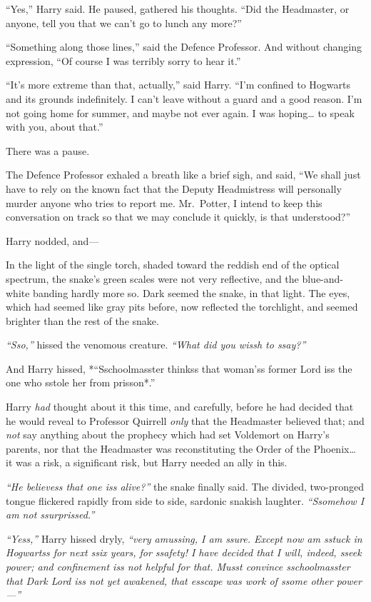 ``Yes,'' Harry said. He paused, gathered his thoughts. ``Did the
Headmaster, or anyone, tell you that we can't go to lunch any more?''

``Something along those lines,'' said the Defence Professor. And without
changing expression, ``Of course I was terribly sorry to hear it.''

``It's more extreme than that, actually,'' said Harry. ``I'm confined to
Hogwarts and its grounds indefinitely. I can't leave without a guard and
a good reason. I'm not going home for summer, and maybe not ever again.
I was hoping\ldots{} to speak with you, about that.''

There was a pause.

The Defence Professor exhaled a breath like a brief sigh, and said, ``We
shall just have to rely on the known fact that the Deputy Headmistress
will personally murder anyone who tries to report me. Mr.~Potter, I
intend to keep this conversation on track so that we may conclude it
quickly, is that understood?''

Harry nodded, and---

In the light of the single torch, shaded toward the reddish end of the
optical spectrum, the snake's green scales were not very reflective, and
the blue-and-white banding hardly more so. Dark seemed the snake, in
that light. The eyes, which had seemed like gray pits before, now
reflected the torchlight, and seemed brighter than the rest of the
snake.

\emph{``Sso,''} hissed the venomous creature. \emph{``What did you wissh
to ssay?''}

And Harry hissed, *``Sschoolmasster thinkss that woman'ss former Lord
iss the one who sstole her from prisson*.''

Harry \emph{had} thought about it this time, and carefully, before he
had decided that he would reveal to Professor Quirrell \emph{only} that
the Headmaster believed that; and \emph{not} say anything about the
prophecy which had set Voldemort on Harry's parents, nor that the
Headmaster was reconstituting the Order of the Phoenix\ldots{} it was a
risk, a significant risk, but Harry needed an ally in this.

\emph{``He believess that one iss alive?''} the snake finally said. The
divided, two-pronged tongue flickered rapidly from side to side,
sardonic snakish laughter. \emph{``Ssomehow I am not ssurprissed.''}

\emph{``Yess,''} Harry hissed dryly, \emph{``very amussing, I am ssure.
Except now am sstuck in Hogwartss for next ssix years, for ssafety! I
have decided that I will, indeed, sseek power; and confinement iss not
helpful for that. Musst convince sschoolmasster that Dark Lord iss not
yet awakened, that esscape was work of ssome other power---''}

